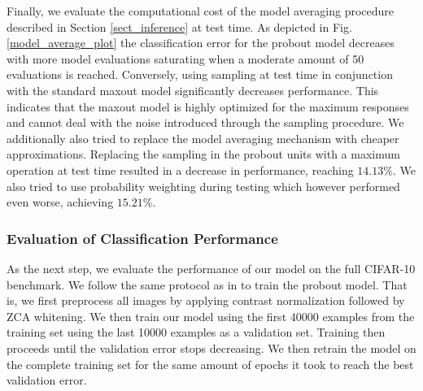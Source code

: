 \documentclass{article} \pdfoutput=1
\begin{document}
Finally, we evaluate the computational cost of the model averaging
procedure described in Section \ref{sect_inference} at test time. As
depicted in Fig. \ref{model_average_plot} the classification error for
the probout model decreases with more model evaluations saturating
when a moderate amount of 50 evaluations is reached. Conversely, using
sampling at test time in conjunction with the standard maxout model
significantly decreases performance. This indicates that the maxout
model is highly optimized for the maximum responses and cannot deal
with the noise introduced through the sampling procedure.  We
additionally also tried to replace the model averaging mechanism with
cheaper approximations. Replacing the sampling in the probout units
with a maximum operation at test time resulted in a decrease in
performance, reaching $14.13 \%$.  We also tried to use probability
weighting during testing \cite{ZeilerStochastic2013} which however
performed even worse, achieving $15.21 \%$.

\subsubsection{Evaluation of Classification Performance}
As the next step, we evaluate the performance of our model on the full
CIFAR-10 benchmark.  We follow the same protocol as in
\cite{Goodfellow2013} to train the probout model. That is, we first
preprocess all images by applying contrast normalization followed by
ZCA whitening. We then train our model using the first 40000 examples
from the training set using the last 10000 examples as a validation
set. Training then proceeds until the validation error stops
decreasing. We then retrain the model on the complete training set for
the same amount of epochs it took to reach the best validation error.
\end{document}
